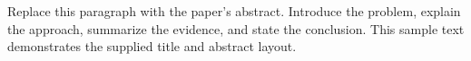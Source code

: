 Replace this paragraph with the paper's abstract. Introduce the problem,
explain the approach, summarize the evidence, and state the conclusion.
This sample text demonstrates the supplied title and abstract layout.
